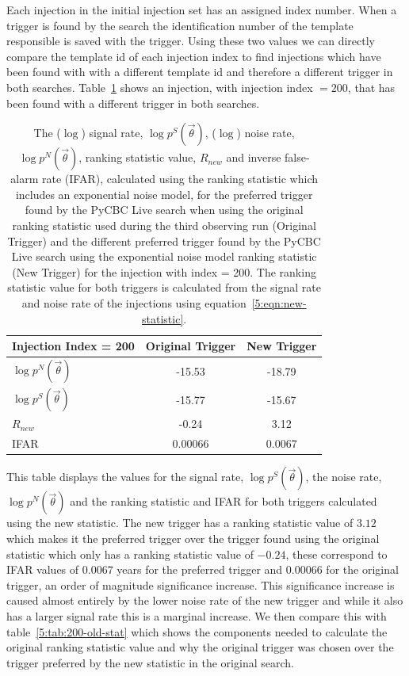 Each injection in the initial injection set has an assigned index number. When a trigger is found by the search the identification number of the template responsible is saved with the trigger. Using these two values we can directly compare the template id of each injection index to find injections which have been found with with a different template id and therefore a different trigger in both searches. Table~\ref{5:tab:200-new-stat} shows an injection, with injection index $= 200$, that has been found with a different trigger in both searches.
%
\begin{table}[ht]
    \centering
    \begin{tabular}{lcc}
        \toprule
        \textbf{Injection Index = 200} & \textbf{Original Trigger} & \textbf{New Trigger} \\
        \midrule
        $\log p^{N}(\Vec{\theta})$  & -15.53 & -18.79 \\
        $\log p^{S}(\Vec{\theta})$ & -15.77 & -15.67 \\
        $R_{new}$ & -0.24 & 3.12 \\
        IFAR & 0.00066 & 0.0067\\
        \bottomrule
    \end{tabular}
    \caption{The ($\log$) signal rate, $\log p^{S}(\Vec{\theta})$, ($\log$) noise rate, $\log p^{N}(\Vec{\theta})$, ranking statistic value, $R_{new}$ and inverse false-alarm rate (IFAR), calculated using the ranking statistic which includes an exponential noise model, for the preferred trigger found by the PyCBC Live search when using the original ranking statistic used during the third observing run (Original Trigger) and the different preferred trigger found by the PyCBC Live search using the exponential noise model ranking statistic (New Trigger) for the injection with index = 200. The ranking statistic value for both triggers is calculated from the signal rate and noise rate of the injections using equation~\ref{5:eqn:new-statistic}.}

    \label{5:tab:200-new-stat}
\end{table}
%
This table displays the values for the signal rate, $\log p^{S}(\Vec{\theta})$, the noise rate, $\log p^{N}(\Vec{\theta})$ and the ranking statistic and IFAR for both triggers calculated using the new statistic. The new trigger has a ranking statistic value of $3.12$ which makes it the preferred trigger over the trigger found using the original statistic which only has a ranking statistic value of $-0.24$, these correspond to IFAR values of $0.0067$ years for the preferred trigger and $0.00066$ for the original trigger, an order of magnitude significance increase. This significance increase is caused almost entirely by the lower noise rate of the new trigger and while it also has a larger signal rate this is a marginal increase. We then compare this with table~\ref{5:tab:200-old-stat} which shows the components needed to calculate the original ranking statistic value and why the original trigger was chosen over the trigger preferred by the new statistic in the original search.
